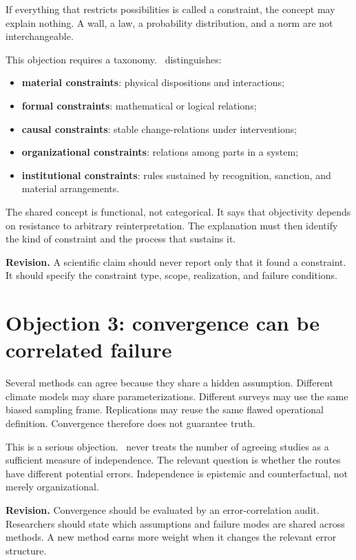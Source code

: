 If everything that restricts possibilities is called a constraint, the concept
may explain nothing. A wall, a law, a probability distribution, and a norm are
not interchangeable.

This objection requires a taxonomy. \RCR\ distinguishes:

\begin{itemize}
\item \textbf{material constraints}: physical dispositions and interactions;
\item \textbf{formal constraints}: mathematical or logical relations;
\item \textbf{causal constraints}: stable change-relations under interventions;
\item \textbf{organizational constraints}: relations among parts in a system;
\item \textbf{institutional constraints}: rules sustained by recognition,
sanction, and material arrangements.
\end{itemize}

The shared concept is functional, not categorical. It says that objectivity
depends on resistance to arbitrary reinterpretation. The explanation must then
identify the kind of constraint and the process that sustains it.

\textbf{Revision.} A scientific claim should never report only that it found a
constraint. It should specify the constraint type, scope, realization, and
failure conditions.

\section{Objection 3: convergence can be correlated failure}

Several methods can agree because they share a hidden assumption. Different
climate models may share parameterizations. Different surveys may use the same
biased sampling frame. Replications may reuse the same flawed operational
definition. Convergence therefore does not guarantee truth.

This is a serious objection. \RCR\ never treats the number of agreeing studies
as a sufficient measure of independence. The relevant question is whether the
routes have different potential errors. Independence is epistemic and
counterfactual, not merely organizational.

\textbf{Revision.} Convergence should be evaluated by an error-correlation
audit. Researchers should state which assumptions and failure modes are shared
across methods. A new method earns more weight when it changes the relevant
error structure.

